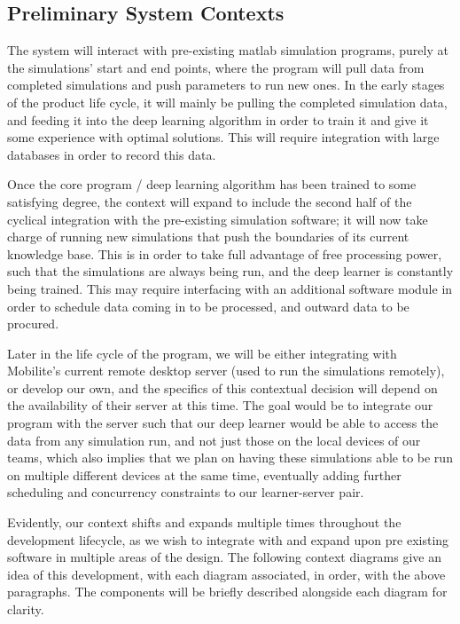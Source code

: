 \documentclass[12pt, titlepage]{article}
\begin{document}
\subsection{Preliminary System Contexts}
The system will interact with pre-existing matlab simulation programs, purely at the simulations’ start and end points, where the program will pull data from completed simulations and push parameters to run new ones. In the early stages of the product life cycle, it will mainly be pulling the completed simulation data, and feeding it into the deep learning algorithm in order to train it and give it some experience with optimal solutions. This will require integration with large databases in order to record this data. 
\par
Once the core program / deep learning algorithm has been trained to some satisfying degree, the context will expand to include the second half of the cyclical integration with the pre-existing simulation software; it will now take charge of running new simulations that push the boundaries of its current knowledge base. This is in order to take full advantage of free processing power, such that the simulations are always being run, and the deep learner is constantly being trained. This may require interfacing with an additional software module in order to schedule data coming in to be processed, and outward data to be procured.
\par 
Later in the life cycle of the program, we will be either integrating with Mobilite’s current remote desktop server (used to run the simulations remotely), or develop our own, and the specifics of this contextual decision will depend on the availability of their server at this time. The goal would be to integrate our program with the server such that our deep learner would be able to access the data from any simulation run, and not just those on the local devices of our teams, which also implies that we plan on having these simulations able to be run on multiple different devices at the same time, eventually adding further scheduling and concurrency constraints to our learner-server pair. 
\par
Evidently, our context shifts and expands multiple times throughout the development lifecycle, as we wish to integrate with and expand upon pre existing software in multiple areas of the design. The following context diagrams give an idea of this development, with each diagram associated, in order, with the above paragraphs. The components will be briefly described alongside each diagram for clarity.
\end{document}
